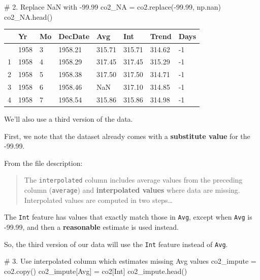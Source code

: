 \documentclass[
  letterpaper,
  DIV=11,
  numbers=noendperiod]{scrreprt}
\newenvironment{Shaded}{\begin{snugshade}}{\end{snugshade}}
\newcommand{\CommentTok}[1]{\textcolor[rgb]{0.37,0.37,0.37}{#1}}
\newcommand{\FloatTok}[1]{\textcolor[rgb]{0.68,0.00,0.00}{#1}}
\newcommand{\NormalTok}[1]{\textcolor[rgb]{0.00,0.23,0.31}{#1}}
\newcommand{\OperatorTok}[1]{\textcolor[rgb]{0.37,0.37,0.37}{#1}}
\newcommand{\StringTok}[1]{\textcolor[rgb]{0.13,0.47,0.30}{#1}}
\begin{document}
\begin{Shaded}
\begin{Highlighting}[]
\CommentTok{\# 2. Replace NaN with {-}99.99}
\NormalTok{co2\_NA }\OperatorTok{=}\NormalTok{ co2.replace(}\OperatorTok{{-}}\FloatTok{99.99}\NormalTok{, np.nan)}
\NormalTok{co2\_NA.head()}
\end{Highlighting}
\end{Shaded}

\begin{longtable}[]{@{}llllllll@{}}
\toprule\noalign{}
& Yr & Mo & DecDate & Avg & Int & Trend & Days \\
\midrule\noalign{}
\endhead
\bottomrule\noalign{}
\endlastfoot
0 & 1958 & 3 & 1958.21 & 315.71 & 315.71 & 314.62 & -1 \\
1 & 1958 & 4 & 1958.29 & 317.45 & 317.45 & 315.29 & -1 \\
2 & 1958 & 5 & 1958.38 & 317.50 & 317.50 & 314.71 & -1 \\
3 & 1958 & 6 & 1958.46 & NaN & 317.10 & 314.85 & -1 \\
4 & 1958 & 7 & 1958.54 & 315.86 & 315.86 & 314.98 & -1 \\
\end{longtable}

We'll also use a third version of the data.

First, we note that the dataset already comes with a \textbf{substitute
value} for the -99.99.

From the file description:

\begin{quote}
The \texttt{interpolated} column includes average values from the
preceding column (\texttt{average}) and \textbf{interpolated values}
where data are missing. Interpolated values are computed in two
steps\ldots{}
\end{quote}

The \texttt{Int} feature has values that exactly match those in
\texttt{Avg}, except when \texttt{Avg} is -99.99, and then a
\textbf{reasonable} estimate is used instead.

So, the third version of our data will use the \texttt{Int} feature
instead of \texttt{Avg}.

\begin{Shaded}
\begin{Highlighting}[]
\CommentTok{\# 3. Use interpolated column which estimates missing Avg values}
\NormalTok{co2\_impute }\OperatorTok{=}\NormalTok{ co2.copy()}
\NormalTok{co2\_impute[}\StringTok{\textquotesingle{}Avg\textquotesingle{}}\NormalTok{] }\OperatorTok{=}\NormalTok{ co2[}\StringTok{\textquotesingle{}Int\textquotesingle{}}\NormalTok{]}
\NormalTok{co2\_impute.head()}
\end{Highlighting}
\end{Shaded}
\end{document}
